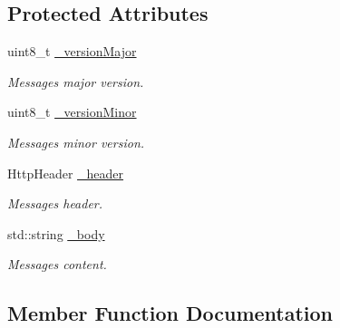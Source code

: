\subsection*{Protected Attributes}
\begin{DoxyCompactItemize}
\item 
\mbox{\label{classZiApi_1_1HttpMessage_a980cd22bd442a6b3a01e66e9117d4c35}} 
uint8\+\_\+t \mbox{\hyperlink{classZiApi_1_1HttpMessage_a980cd22bd442a6b3a01e66e9117d4c35}{\+\_\+version\+Major}}
\begin{DoxyCompactList}\small\item\em Message\textquotesingle{}s major version. \end{DoxyCompactList}\item 
\mbox{\label{classZiApi_1_1HttpMessage_a36161a0628e2bd17d5cd1bc2da8a1448}} 
uint8\+\_\+t \mbox{\hyperlink{classZiApi_1_1HttpMessage_a36161a0628e2bd17d5cd1bc2da8a1448}{\+\_\+version\+Minor}}
\begin{DoxyCompactList}\small\item\em Message\textquotesingle{}s minor version. \end{DoxyCompactList}\item 
\mbox{\label{classZiApi_1_1HttpMessage_a649867b80ecf41e6c32170ebe206be26}} 
Http\+Header \mbox{\hyperlink{classZiApi_1_1HttpMessage_a649867b80ecf41e6c32170ebe206be26}{\+\_\+header}}
\begin{DoxyCompactList}\small\item\em Message\textquotesingle{}s header. \end{DoxyCompactList}\item 
\mbox{\label{classZiApi_1_1HttpMessage_a3fa98de77c767e106b0579d43ea62c33}} 
std\+::string \mbox{\hyperlink{classZiApi_1_1HttpMessage_a3fa98de77c767e106b0579d43ea62c33}{\+\_\+body}}
\begin{DoxyCompactList}\small\item\em Message\textquotesingle{}s content. \end{DoxyCompactList}\end{DoxyCompactItemize}


\subsection{Member Function Documentation}
\mbox{\label{classZiApi_1_1HttpMessage_a5b8b70f012a623dd79dcbd6a49ec4704}} 
